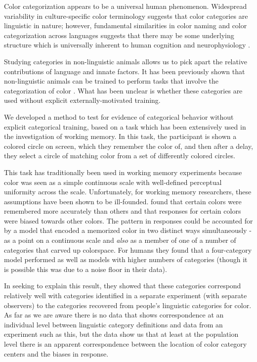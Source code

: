 Color categorization appears to be a universal human phenomenon. 
Widespread variability in culture-specific color terminology suggests that color categories are linguistic in nature; however, fundamental similarities in color naming and color categorization across languages suggests that there may be some underlying structure which is universally inherent to human cognition and neurophysiology \citep{berlin_basic_1991,gibson_color_2017}. 

Studying categories in non-linguistic animals allows us to pick apart the relative contributions of language and innate factors. It has been previously shown that non-linguistic animals can be trained to perform tasks that involve the categorization of color \citep{sandell_color_1979,fagot_cross-species_2006}. 
What has been unclear is whether these categories are used without explicit externally-motivated training.


We developed a method to test for evidence of categorical behavior without explicit categorical training, based on a task which has been extensively used in the investigation of working memory. %
In this task, the participant is shown a colored circle on screen, which they remember the color of, and then after a delay, they select a circle of matching color from a set of differently colored circles.

This task has traditionally been used in working memory experiments because color was seen as a simple continuous scale with well-defined perceptual uniformity across the scale. 
Unfortunately, for working memory researchers, these assumptions have been shown to be ill-founded.
\cite{bae_why_2015} found that certain colors were remembered more accurately than others and that responses for certain colors were biased towards other colors.
The pattern in responses could be accounted for by a model that encoded a memorized color in two distinct ways simultaneously - as a point on a continuous scale and \emph{also} as a member of one of a number of categories that carved up colorspace. 
For humans they found that a four-category model performed as well as models with higher numbers of categories (though it is possible this was due to a noise floor in their data).

In seeking to explain this result, they showed that these categories correspond relatively well with categories identified in a separate experiment (with separate observers) to the categories recovered from people's linguistic categories for color. 
As far as we are aware there is no data that shows correspondence at an individual level between linguistic category definitions and data from an experiment such as this, but the \cite{bae_why_2015} data show us that at least at the population level there is an apparent correspondence between the location of color category centers and the biases in response.


